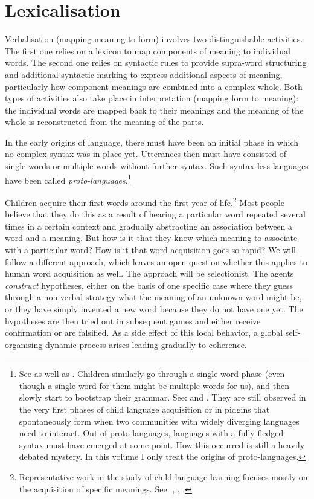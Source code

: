 \section{Lexicalisation}

Verbalisation (mapping meaning to form) 
involves two distinguishable activities.  The first one
relies on a lexicon to map components of meaning to
individual words. The second 
one relies on syntactic rules to provide supra-word structuring 
and additional syntactic marking to express additional
aspects of meaning, particularly how component meanings
are combined into a complex whole. Both types of 
activities also take place in interpretation (mapping form to meaning):
the individual words are mapped back to their meanings
and the meaning of the whole is reconstructed from the 
meaning of the parts. 

In the early origins of language,
there must have been an initial phase in which no complex syntax 
was in place yet. Utterances then must have consisted of single words
or multiple words without further syntax. 
Such syntax-less languages have been called {\it proto-languages}.\footnote{
See \cite{Bickerton:1990} as well as \cite{Thomason:1988}. Children similarly 
go through a single word phase (even though a single 
word for them might be multiple words for us), and 
then slowly start to bootstrap their grammar. 
See: \cite{Tomasello:1991} and \cite{Bates:1991}. 
They are still observed in the very first phases of 
child language acquisition or in pidgins that spontaneously 
form when two communities with widely diverging languages
need to interact. Out of proto-languages, languages 
with a fully-fledged syntax must have emerged at some point. 
How this occurred is still a heavily debated mystery. In this volume 
I only treat the origins of proto-languages.} 

Children acquire their first words around the first year
of life.\footnote{
Representative work in the study of child language
learning focuses mostly on the acquisition of specific meanings.
See: \cite{Gleitman:1994}, 
\cite{Clark:1993}, \cite{Bowerman:1996}.}
Most people believe that they do this 
as a result of hearing a particular word repeated several times in a
certain context and gradually abstracting an
association between a word and a meaning. But 
how is it that they know which meaning to associate with a 
particular word? How is it that word acquisition goes
so rapid? We will follow a different 
approach, which leaves an open question whether
this applies to human word acquisition as well. The
approach will be selectionist. The agents {\it construct} 
hypotheses, either on the basis of one specific case 
where they guess through a non-verbal strategy what 
the meaning of an unknown word might be, 
or they have simply invented a new word because
they do not have one yet. The hypotheses are 
then tried out in subsequent games and either receive confirmation
or are falsified. As a side effect of this local behavior, 
a global self-organising dynamic process arises leading gradually to coherence. 

